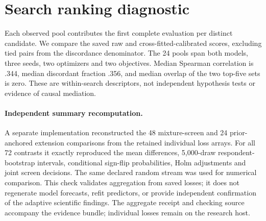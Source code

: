 \documentclass[10pt,twocolumn]{article}
\begin{document}
\section{Search ranking diagnostic}
Each observed pool contributes the first complete evaluation per distinct
candidate. We compare the saved raw and cross-fitted-calibrated scores,
excluding tied pairs from the discordance denominator. The 24 pools span both
models, three seeds, two optimizers and two objectives. Median Spearman
correlation is .344, median discordant fraction .356, and median overlap of the
two top-five sets is zero. These are within-search descriptors, not independent
hypothesis tests or evidence of causal mediation.

\paragraph{Independent summary recomputation.}
A separate implementation reconstructed the 48 mixture-screen and 24
prior-anchored extension comparisons from the retained individual loss arrays.
For all 72 contrasts it exactly reproduced the mean differences, 5,000-draw
respondent-bootstrap intervals, conditional sign-flip probabilities, Holm
adjustments and joint screen decisions. The same declared random stream was
used for numerical comparison. This check validates aggregation from saved
losses; it does not regenerate model forecasts, refit predictors, or provide
independent confirmation of the adaptive scientific findings. The aggregate
receipt and checking source accompany the evidence bundle; individual losses
remain on the research host.
\end{document}
